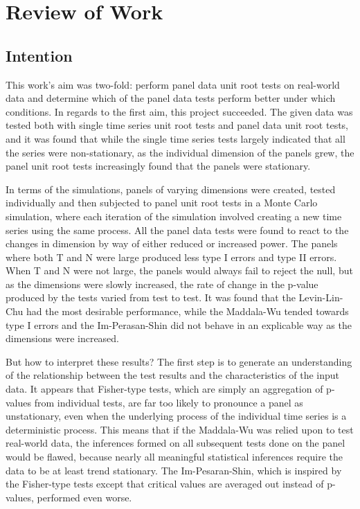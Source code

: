 \section{Review of Work}

\subsection{Intention}
This work’s aim was two-fold: perform panel data unit root tests on real-world data and determine which of the panel data tests perform better under which conditions. In regards to the first aim, this project succeeded. The given data was tested both with single time series unit root tests and panel data unit root tests, and it was found that while the single time series tests largely indicated that all the series were non-stationary, as the individual dimension of the panels grew, the panel unit root tests increasingly found that the panels were stationary.

In terms of the simulations, panels of varying dimensions were created, tested individually and then subjected to panel unit root tests in a Monte Carlo simulation, where each iteration of the simulation involved creating a new time series using the same process. All the panel data tests were found to react to the changes in dimension by way of either reduced or increased power. The panels where both T and N were large produced less type I errors and type II errors. When T and N were not large, the panels would always fail to reject the null, but as the dimensions were slowly increased, the rate of change in the p-value produced by the tests varied from test to test. It was found that the Levin-Lin-Chu had the most desirable performance, while the Maddala-Wu tended towards type I errors and the Im-Perasan-Shin did not behave in an explicable way as the dimensions were increased. 

But how to interpret these results? The first step is to generate an understanding of the relationship between the test results and the characteristics of the input data. It appears that Fisher-type tests, which are simply an aggregation of p-values from individual tests, are far too likely to pronounce a panel as unstationary, even when the underlying process of the individual time series is a deterministic process. This means that if the Maddala-Wu was relied upon to test real-world data, the inferences formed on all subsequent tests done on the panel would be flawed, because nearly all meaningful statistical inferences require the data to be at least trend stationary. The Im-Pesaran-Shin, which is inspired by the Fisher-type tests except that critical values are averaged out instead of p-values, performed even worse.

